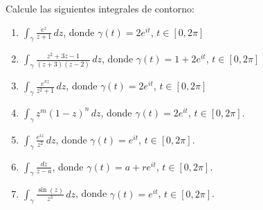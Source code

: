 \begin{exercise}
Calcule las siguientes integrales de contorno:

\begin{enumerate}[label=(\alph*)]
    \item $\displaystyle \int_\gamma \frac {e^z} {z + 1} \, dz$, donde $\gamma(t) = 2e^{it}$, $t \in [0, 2\pi]$
    
    \item $\displaystyle \int_\gamma \frac {z^2 + 3z - 1} {(z + 3) (z - 2)} \, dz$, donde $\gamma(t) = 1 + 2e^{it}$, $t \in [0, 2\pi]$
    
    \item $\displaystyle \int_\gamma \frac {e^{\pi z}} {z^2 + 1} \, dz$, donde $\gamma(t) = 2e^{it}$, $t \in [0, 2\pi]$
    
    \item $\displaystyle \int_\gamma z^m (1-z)^n \, dz$, donde $\gamma(t) = 2e^{it}$, $t \in [0, 2\pi]$.
    
    \item $\displaystyle \int_\gamma \frac {e^{iz}} {z^2} \, dz$, donde $\gamma(t) = e^{it}$, $t \in [0, 2\pi]$.
    
    \item $\displaystyle \int_\gamma \frac {dz} {z-a}$, donde $\gamma(t) = a + re^{it}$, $t \in [0, 2\pi]$.
    
    \item $\displaystyle \int_\gamma \frac {\sin(z)} {z^3} \, dz$, donde $\gamma(t) = e^{it}$, $t \in [0, 2\pi]$.
\end{enumerate}
\end{exercise}

